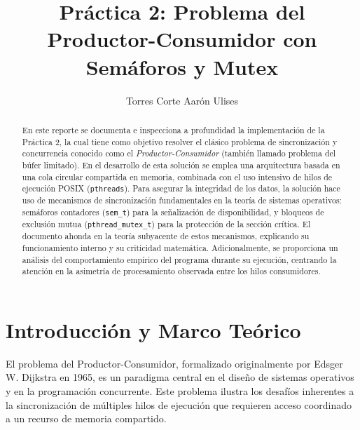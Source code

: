 \documentclass[runningheads]{llncs}
\begin{document}
\title{Práctica 2: Problema del Productor-Consumidor con Semáforos y Mutex}
\author{Torres Corte Aarón Ulises}

\maketitle

\begin{abstract}
En este reporte se documenta e inspecciona a profundidad la implementación de la Práctica 2, la cual tiene como objetivo resolver el clásico problema de sincronización y concurrencia conocido como el \textit{Productor-Consumidor} (también llamado problema del búfer limitado). En el desarrollo de esta solución se emplea una arquitectura basada en una cola circular compartida en memoria, combinada con el uso intensivo de hilos de ejecución POSIX (\texttt{pthreads}). Para asegurar la integridad de los datos, la solución hace uso de mecanismos de sincronización fundamentales en la teoría de sistemas operativos: semáforos contadores (\texttt{sem\_t}) para la señalización de disponibilidad, y bloqueos de exclusión mutua (\texttt{pthread\_mutex\_t}) para la protección de la sección crítica. El documento ahonda en la teoría subyacente de estos mecanismos, explicando su funcionamiento interno y su criticidad matemática. Adicionalmente, se proporciona un análisis del comportamiento empírico del programa durante su ejecución, centrando la atención en la asimetría de procesamiento observada entre los hilos consumidores.
\end{abstract}

\section{Introducción y Marco Teórico}
El problema del Productor-Consumidor, formalizado originalmente por Edsger W. Dijkstra en 1965, es un paradigma central en el diseño de sistemas operativos y en la programación concurrente. Este problema ilustra los desafíos inherentes a la sincronización de múltiples hilos de ejecución que requieren acceso coordinado a un recurso de memoria compartido. 
\end{document}
